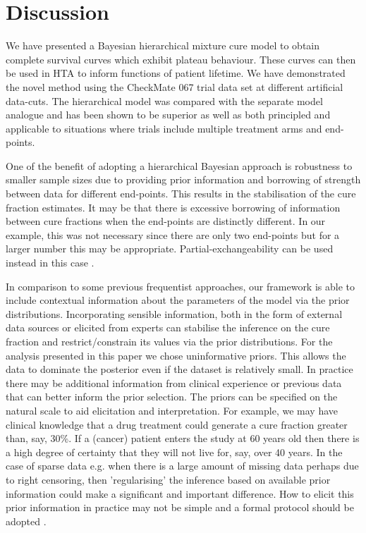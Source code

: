 \documentclass[AMA,STIX1COL]{WileyNJD-v2}
\begin{document}



%
\section{Discussion}\label{sec:discussion}
We have presented a Bayesian hierarchical mixture cure model to obtain complete survival curves which exhibit plateau behaviour. These curves can then be used in HTA to inform functions of patient lifetime.
We have demonstrated the novel method using the CheckMate 067 trial data set at different artificial data-cuts.
The hierarchical model was compared with the separate model analogue and has been shown to be superior as well as both principled and applicable to situations where trials include multiple treatment arms and end-points.

One of the benefit of adopting a hierarchical Bayesian approach is robustness to smaller sample sizes due to providing prior information and borrowing of strength between data for different end-points.
This results in the stabilisation of the cure fraction estimates.
It may be that there is excessive borrowing of information between cure fractions when the end-points are distinctly different.
In our example, this was not necessary since there are only two end-points but for a larger number this may be appropriate.
Partial-exchangeability can be used instead in this case \cite{Neuenschwander2016}.

In comparison to some previous frequentist approaches, our framework is able to include contextual information about the parameters of the model via the prior distributions.
Incorporating sensible information, both in the form of external data sources or elicited from experts can
stabilise the inference on the cure fraction and restrict/constrain its values via the prior distributions.
For the analysis presented in this paper we chose uninformative priors.
This allows the data to dominate the posterior even if the dataset is relatively small.
In practice there may be additional information from clinical experience or previous data that can better inform the prior selection.
The priors can be specified on the natural scale to aid elicitation and interpretation.
For example, we may have clinical knowledge that a drug treatment could generate a cure fraction greater than, say, 30\%.
If a (cancer) patient enters the study at 60 years old then there is a high degree of certainty that they will not live for, say, over 40 years.
In the case of sparse data e.g. when there is a large amount of missing data perhaps due to right censoring, then 'regularising' the inference based on available prior information could make a significant and important difference.
How to elicit this prior information in practice may not be simple and a formal protocol should be adopted \cite{OHagan2019}.
\end{document}
